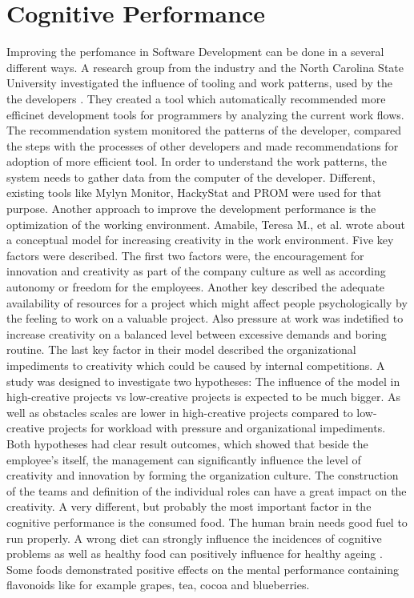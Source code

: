 \section{Cognitive Performance}
Improving the perfomance in Software Development can be done in a several different ways. A research group from the industry and the North Carolina State University investigated the influence of tooling and work patterns, used by the the developers \cite{snipes2013towards}. They created a tool which automatically recommended more efficinet development tools for programmers by analyzing the current work flows. The recommendation system monitored the patterns of the developer, compared the steps with the processes of other developers and made recommendations for adoption of more efficient tool.
In order to understand the work patterns, the system needs to gather data from the computer of the developer. Different, existing tools like Mylyn Monitor, HackyStat and PROM were used for that purpose.
Another approach to improve the development performance is the optimization of the working environment. Amabile, Teresa M., et al. \cite{amabile1996assessing} wrote about a conceptual model for increasing creativity in the work environment. Five key factors were described. The first two factors were, the encouragement for innovation and creativity as part of the company culture as well as according autonomy or freedom for the employees. Another key described the adequate availability of resources for a project which might affect people psychologically by the feeling to work on a valuable project. Also pressure at work was indetified to increase creativity on a balanced level between excessive demands and boring routine. The last key factor in their model described the organizational impediments to creativity which could be caused by internal competitions.
A study was designed to investigate two hypotheses: The influence of the model in high-creative projects vs low-creative projects is expected to be much bigger. As well as obstacles scales are lower in high-creative projects compared to low-creative projects for workload with pressure and organizational impediments.
Both hypotheses had clear result outcomes, which showed that beside the employee's itself, the management can significantly influence the level of creativity and innovation by forming the organization culture. The construction of the teams and definition of the individual roles can have a great impact on the creativity. 
A very different, but probably the most important factor in the cognitive performance is the consumed food. The human brain needs good fuel to run properly. A wrong diet can strongly influence the incidences of cognitive problems as well as healthy food can positively influence for healthy ageing \cite{spencer2008food}. Some foods demonstrated positive effects on the mental performance containing flavonoids like for example grapes, tea, cocoa and blueberries. 

